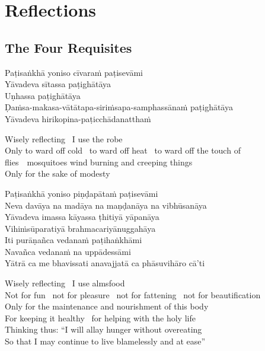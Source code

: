 
\chapter{Reflections}

\section{The Four Requisites}
\label{four-requisites}

\begin{leader}
\end{leader}

Paṭisaṅkhā yoniso cīvaraṁ paṭisevāmi\\
Yāvadeva sītassa paṭighātāya\\
Uṇhassa paṭighātāya\\
Ḍaṁsa-makasa-vātātapa-siriṁsapa-samphassānaṁ paṭighātāya\\
Yāvadeva hirikopina-paṭicchādanatthaṁ

\begin{english-verses}
  Wisely reflecting \breathmark\ I use the robe\\
  Only to ward off cold \breathmark\ to ward off heat \breathmark\ to ward off the touch of \mbox{flies}~\breathmark\ mosquitoes wind burning and creeping things\\
  Only for the sake of modesty
\end{english-verses}

Paṭisaṅkhā yoniso piṇḍapātaṁ paṭisevāmi\\
Neva davāya na madāya na maṇḍanāya na vibhūsanāya\\
Yāvadeva imassa kāyassa ṭhitiyā yāpanāya\\
Vihiṁsūparatiyā brahmacariyānuggahāya\\
Iti purāṇañca vedanaṁ paṭihaṅkhāmi\\
Navañca vedanaṁ na uppādessāmi\\
Yātrā ca me bhavissati anavajjatā ca phāsuvihāro cā'ti

\begin{english-verses}
  Wisely reflecting \breathmark\ I use almsfood\\
  Not for fun \breathmark\ not for pleasure \breathmark\ not for fattening \breathmark\ not for beautification\\
  Only for the maintenance and nourishment of this body\\
  For keeping it healthy \breathmark\ for helping with the holy life\\
  Thinking thus: ``I will allay hunger without overeating\\
  So that I may continue to live blamelessly and at ease''
\end{english-verses}

